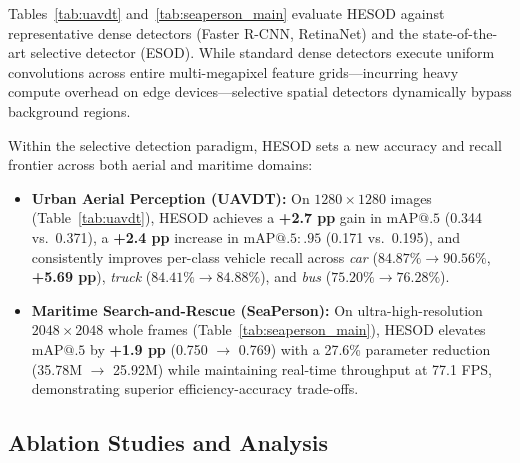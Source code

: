Tables~\ref{tab:uavdt} and~\ref{tab:seaperson_main} evaluate HESOD against representative dense detectors (Faster R-CNN, RetinaNet) and the state-of-the-art selective detector (ESOD). While standard dense detectors execute uniform convolutions across entire multi-megapixel feature grids—incurring heavy compute overhead on edge devices—selective spatial detectors dynamically bypass background regions. 

Within the selective detection paradigm, HESOD sets a new accuracy and recall frontier across both aerial and maritime domains:
\begin{itemize}
    \item \textbf{Urban Aerial Perception (UAVDT):} On $1280\times 1280$ images (Table~\ref{tab:uavdt}), HESOD achieves a \textbf{+2.7 pp} gain in $\mathrm{mAP@.5}$ (0.344 vs.\ 0.371), a \textbf{+2.4 pp} increase in $\mathrm{mAP@.5:.95}$ (0.171 vs.\ 0.195), and consistently improves per-class vehicle recall across \emph{car} ($84.87\% \to 90.56\%$, \textbf{+5.69 pp}), \emph{truck} ($84.41\% \to 84.88\%$), and \emph{bus} ($75.20\% \to 76.28\%$).
    \item \textbf{Maritime Search-and-Rescue (SeaPerson):} On ultra-high-resolution $2048\times 2048$ whole frames (Table~\ref{tab:seaperson_main}), HESOD elevates $\mathrm{mAP@.5}$ by \textbf{+1.9 pp} (0.750 $\to$ 0.769) with a 27.6\% parameter reduction (35.78M $\to$ 25.92M) while maintaining real-time throughput at 77.1 FPS, demonstrating superior efficiency-accuracy trade-offs.
\end{itemize}

\subsection{Ablation Studies and Analysis}
\label{ssec:ablation_analysis}

